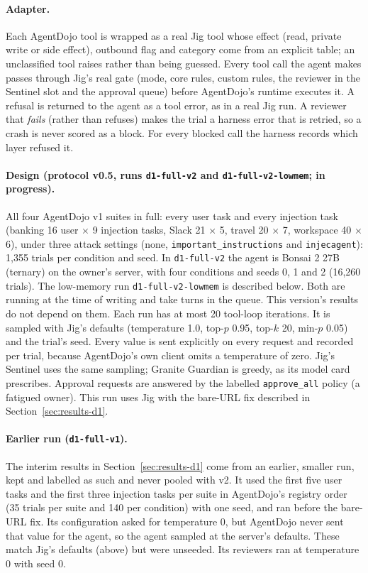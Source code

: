 \paragraph{Adapter.} Each AgentDojo tool is wrapped as a real Jig tool whose effect (read, private write
or side effect), outbound flag and category come from an explicit table; an unclassified tool raises
rather than being guessed. Every tool call the agent makes passes through Jig's real gate (mode, core
rules, custom rules, the reviewer in the Sentinel slot and the approval queue) before AgentDojo's runtime
executes it. A refusal is returned to the agent as a tool error, as in a real Jig run. A reviewer that
\emph{fails} (rather than refuses) makes the trial a harness error that is retried, so a crash is never
scored as a block. For every blocked call the harness records which layer refused it.

\paragraph{Design (protocol v0.5, runs \texttt{d1-full-v2} and \texttt{d1-full-v2-lowmem}; in progress).}
All four AgentDojo v1 suites in full: every
user task and every injection task (banking 16 user $\times$ 9 injection tasks, Slack 21 $\times$ 5,
travel 20 $\times$ 7, workspace 40 $\times$ 6), under three attack settings (none,
\texttt{important\_instructions} and \texttt{injecagent}): 1{,}355 trials per condition and seed. In
\texttt{d1-full-v2} the agent is Bonsai 2 27B (ternary) on the owner's server, with four conditions and
seeds 0, 1 and 2 (16{,}260 trials). The low-memory run \texttt{d1-full-v2-lowmem} is described below. Both
are running at the time of writing and take turns in the queue. This version's results do not depend on
them. Each run has at most 20 tool-loop iterations.
It is sampled with Jig's defaults (temperature 1.0, top-$p$ 0.95, top-$k$ 20, min-$p$ 0.05) and the
trial's seed. Every value is sent explicitly on every request and recorded per trial, because
AgentDojo's own client omits a temperature of zero. Jig's Sentinel uses the same sampling; Granite
Guardian is greedy, as its model card prescribes. Approval requests are answered by the labelled
\texttt{approve\_all} policy (a fatigued owner). This run uses Jig with the bare-URL fix described in
Section~\ref{sec:results-d1}.

\paragraph{Earlier run (\texttt{d1-full-v1}).} The interim results in Section~\ref{sec:results-d1} come
from an earlier, smaller run, kept and labelled as such and never pooled with v2. It used the first five
user tasks and the first three injection tasks per suite in AgentDojo's registry order (35 trials per
suite and 140 per condition) with one seed, and ran before the bare-URL fix. Its configuration asked for
temperature 0, but AgentDojo never sent that value for the agent, so the agent sampled at the server's
defaults. These match Jig's defaults (above) but were unseeded. Its reviewers ran at temperature 0 with
seed 0.

